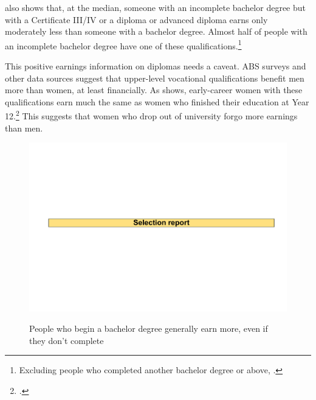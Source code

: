  also shows that, at the median, someone with an incomplete bachelor degree but with a Certificate III/IV or a diploma or advanced diploma earns only moderately less than someone with a bachelor degree. Almost half of people with an incomplete bachelor degree have one of these qualifications.\footnote{Excluding people who completed another bachelor degree or above, \textcite{ABS2016f}.}

This positive earnings information on diplomas needs a caveat. ABS surveys and other data sources suggest that upper-level vocational qualifications benefit men more than women, at least financially. As  shows, early-career women with these qualifications earn much the same as women who finished their education at Year 12.\footcites[][49--51]{Wilkins2016}[][section~3.2.2]{Norton2017d} 
This suggests that women who drop out of university forgo more earnings than men.

                \begin{figure}
                    \caption{People who begin a bachelor degree generally earn more, even if they don't complete\label{fig:10}}%
                    \includegraphics[page=13]{atlas/selection_chartdeck.pdf} 
                    {\textcite{ABS2016f}}
                \end{figure}

